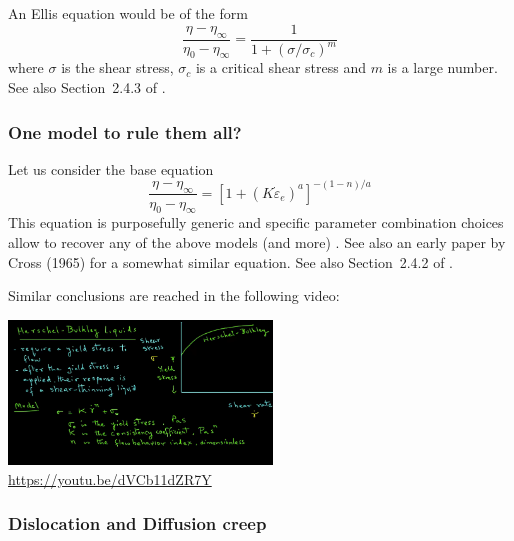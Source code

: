 An Ellis equation would be of the form \cite{robc01} 
\begin{equation}
\frac{\eta-\eta_\infty}{\eta_0-\eta_\infty} =
\frac{1}{1+(\sigma/\sigma_c)^m}
\end{equation}
where $\sigma$ is the shear stress, $\sigma_c$ is a critical shear stress
and $m$ is a large number. 
See also Section~2.4.3 of \textcite{macosko}. 

\subsubsection{One model to rule them all? \label{ss:cross}}

Let us consider the base equation
\begin{equation}
\boxed{
\frac{\eta-\eta_\infty}{\eta_0-\eta_\infty} = 
\left[ 1+(K \dot{\varepsilon}_e)^a  \right]^{-(1-n)/a}
}
\end{equation}
This equation is purposefully generic and specific parameter combination choices 
allow to recover any of the above models (and more) \cite{osru14}.
See also an early paper by Cross (1965) \cite{cros65} for a somewhat similar equation.
See also Section~2.4.2 of \textcite{macosko}. 

Similar conclusions are reached in the following video:
\begin{center}
\includegraphics[width=7cm]{images/rheology/hbyoutube}\\
{\captionfont \url{https://youtu.be/dVCb11dZR7Y}}
\end{center}

\subsubsection{Dislocation and Diffusion creep}

